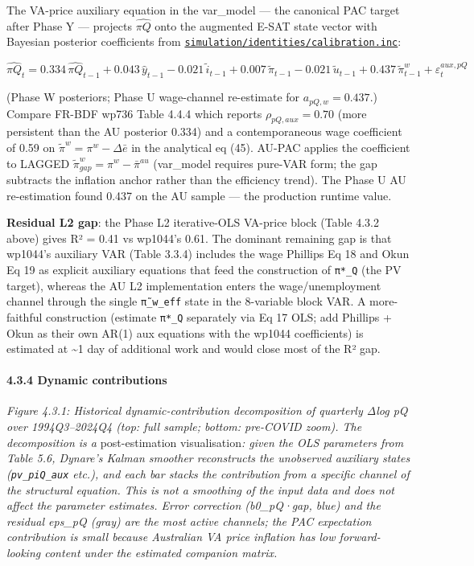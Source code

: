 \documentclass[
]{article}
\begin{document}
The VA-price auxiliary equation in the var\_model --- the canonical PAC
target after Phase Y --- projects \(\widehat{\pi Q}\) onto the augmented
E-SAT state vector with Bayesian posterior coefficients from
\href{simulation/identities/calibration.inc}{\texttt{simulation/identities/calibration.inc}}:

\[\widehat{\pi Q}_t = 0.334\, \widehat{\pi Q}_{t-1} + 0.043\, \hat{y}_{t-1} - 0.021\, \tilde{i}_{t-1} + 0.007\, \tilde{\pi}_{t-1} - 0.021\, \tilde{u}_{t-1} + 0.437\, \tilde{\pi}^w_{t-1} + \varepsilon^{aux,pQ}_t\]

(Phase W posteriors; Phase U wage-channel re-estimate for
\(a_{pQ,w} = 0.437\).) Compare FR-BDF wp736 Table 4.4.4 which reports
\(\rho_{pQ,aux} = 0.70\) (more persistent than the AU posterior 0.334)
and a contemporaneous wage coefficient of 0.59 on
\(\tilde{\pi}^w = \pi^w - \Delta\bar{e}\) in the analytical eq (45).
AU-PAC applies the coefficient to LAGGED
\(\tilde{\pi}^w_{gap} = \pi^w - \bar{\pi}^{au}\) (var\_model requires
pure-VAR form; the gap subtracts the inflation anchor rather than the
efficiency trend). The Phase U AU re-estimation found 0.437 on the AU
sample --- the production runtime value.

\textbf{Residual L2 gap}: the Phase L2 iterative-OLS VA-price block
(Table 4.3.2 above) gives R² = 0.41 vs wp1044's 0.61. The dominant
remaining gap is that wp1044's auxiliary VAR (Table 3.3.4) includes the
wage Phillips Eq 18 and Okun Eq 19 as explicit auxiliary equations that
feed the construction of \texttt{π*\_Q} (the PV target), whereas the AU
L2 implementation enters the wage/unemployment channel through the
single \texttt{π̃\_w\_eff} state in the 8-variable block VAR. A
more-faithful construction (estimate \texttt{π*\_Q} separately via Eq 17
OLS; add Phillips + Okun as their own AR(1) aux equations with the
wp1044 coefficients) is estimated at \textasciitilde1 day of additional
work and would close most of the R² gap.

\paragraph{4.3.4 Dynamic contributions}\label{dynamic-contributions}

\emph{Figure 4.3.1: Historical dynamic-contribution decomposition of
quarterly Δlog pQ over 1994Q3--2024Q4 (top: full sample; bottom:
pre-COVID zoom). The decomposition is a }post-estimation
visualisation\emph{: given the OLS parameters from Table 5.6, Dynare's
Kalman smoother reconstructs the unobserved auxiliary states
(\texttt{pv\_piQ\_aux} etc.), and each bar stacks the contribution from
a specific channel of the structural equation. This is not a smoothing
of the input data and does not affect the parameter estimates. Error
correction (b0\_pQ·gap, blue) and the residual eps\_pQ (gray) are the
most active channels; the PAC expectation contribution is small because
Australian VA price inflation has low forward-looking content under the
estimated companion matrix.}
\end{document}
